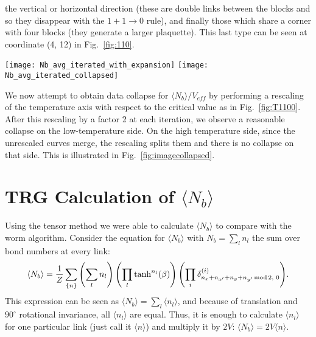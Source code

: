 \documentclass[../main.tex]{subfiles}
\begin{document}
the vertical or horizontal direction (these are double links between the blocks
and so they disappear with the $1+1\rightarrow0$ rule), and finally those which
share a corner with four blocks (they generate a larger plaquette).
%
This last type can be seen at coordinate (4, 12) in Fig.~\ref{fig:110}.
%
\begin{figure*}[htpb]
    \centering 
    \texttt{[image: Nb\_avg\_iterated\_with\_expansion]}\hfill%
    \texttt{[image: Nb\_avg\_iterated\_collapsed]}
    \caption{(a) Average number of bonds $\langle N_b\rangle$ vs.\ temperature
      $T$ under iterated blocking steps beginning with an initial lattice size
      of $L = 64$. The dashed black line illustrates the high temperature
      expansion, showing that the dominant configurations are those consisting
      of small, isolated plaquettes. (b) Average number of bonds $\langle
      N_b\rangle$ vs.\ the rescaled temperature $(T - 2.269) /
      L_{\mathrm{eff}}$ under successive blocking steps. Iteration 0 represents
      the original lattice before blocking, with $L_{\mathrm{eff}} = 64$. }%
\label{fig:imagecollapsed}
\end{figure*}
%
We now attempt to obtain data collapse for $\langle N_b \rangle/V_{eff}$ by
performing a rescaling of the temperature axis with respect to the critical
value as in Fig.~\ref{fig:T1100}.
%
After this rescaling by a factor 2 at each iteration, we observe a reasonable
collapse on the low-temperature side.
%
On the high temperature side, since the unrescaled curves merge, the rescaling
splits them and there is no collapse on that side.
%
This is illustrated in Fig.~\ref{fig:imagecollapsed}.  

\section{TRG Calculation of \texorpdfstring{$\langle N_b \rangle$}{<Nb>}}%
\label{sec:nbtrg}
Using the tensor method we were able to calculate $\langle N_{b} \rangle$ to
compare with the worm algorithm.
%
Consider the equation for $\langle N_{b} \rangle$ with $N_{b} = \sum_{l} n_{l}$
the sum over bond numbers at every link:
%
\begin{equation}
    \langle N_{b} \rangle = \frac{1}{Z} \sum_{\{n\}} \left( \sum_{l} n_{l}
    \right) \left( \prod_{l} \tanh^{n_{l}}(\beta) \right){\left(
    \prod_{i}
    \delta^{(i)}_{n_{x}+n_{{x^{\prime}}}+n_{y}+n_{{y^{\prime}}}\,\mathrm{mod}\,2,\,\,0}\right)}.
\end{equation}
%
This expression can be seen as $\langle N_{b} \rangle = \sum_{l} \langle n_{l}
\rangle$, and because of translation and $90^{\circ}$ rotational invariance,
all $\langle n_{l} \rangle$ are equal.
%
Thus, it is enough to calculate
$\langle n_{l} \rangle$ for one particular link (just call it $\langle
n\rangle$) and multiply it by $2V$: $\langle N_{b} \rangle = 2V \langle n
\rangle$.
\end{document}
